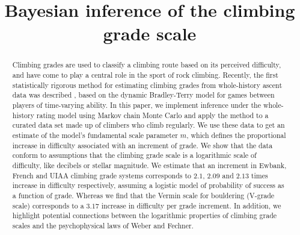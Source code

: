 \documentclass[ba]{imsart}
\newcommand{\ewbankslope}{2.1}
\newcommand{\frenchslope}{2.09}
\newcommand{\uiaaslope}{2.13}
\newcommand{\verminslope}{3.17}
\begin{document}
\begin{frontmatter}
\title{Bayesian inference of the climbing grade scale}


\begin{abstract}
Climbing grades are used to classify a climbing route based on its perceived difficulty, and have come to play a central role in the sport of rock climbing. Recently, the first statistically rigorous method for estimating climbing grades from whole-history ascent data was described \citep{scarff2020estimation}, based on the dynamic Bradley-Terry model for games between players of time-varying ability. In this paper, we implement inference under the whole-history rating model using Markov chain Monte Carlo and apply the method to a curated data set made up of climbers who climb regularly. We use these data to get an estimate of the model's fundamental scale parameter $m$, which defines the proportional increase in difficulty associated with an increment of grade. We show that the data conform to assumptions that the climbing grade scale is a logarithmic scale of difficulty, like decibels or stellar magnitude. We estimate that an increment in Ewbank, French and UIAA climbing grade systems corresponds to $\ewbankslope{}$, $\frenchslope{}$ and $\uiaaslope$ times increase in difficulty respectively, assuming a logistic model of probability of success as a function of grade. Whereas we find that the Vermin scale for bouldering (V-grade scale) corresponds to a $\verminslope$ increase in difficulty per grade increment. In addition, we highlight potential connections between the logarithmic properties of climbing grade scales and the psychophysical laws of Weber and Fechner.
\end{abstract}

\begin{keyword}
\end{keyword}

\end{frontmatter}
\end{document}
